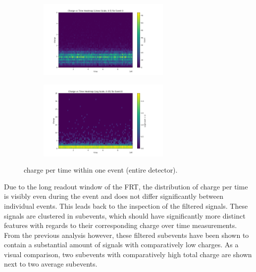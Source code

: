\begin{figure}[ht]
    \centering
    \begin{subfigure}[b]{\textwidth}
        \centering
        \includegraphics[width=0.7\textwidth]{Plots/charge_time_1_lin.png}
    \end{subfigure}
    \vspace{1em} %
    \begin{subfigure}[b]{\textwidth}
        \centering
        \includegraphics[width=0.7\textwidth]{Plots/charge_time_1_log.png}
    \end{subfigure}
    \caption{charge per time within one event (entire detector).}
    \label{fig:charge_time_1}
\end{figure}

Due to the long readout window of the FRT, the distribution of charge per time is visibly even during the event and does not differ significantly between 
individual events. This leads back to the inspection of the filtered signals. These signals are clustered in subevents, which should have significantly
more distinct features with regards to their corresponding charge over time measurements. From the previous analysis however, these filtered subevents 
have been shown to contain a substantial amount of signals with comparatively low charges. As a visual comparison, two subevents with comparatively high 
total charge are shown next to two average subevents. 

